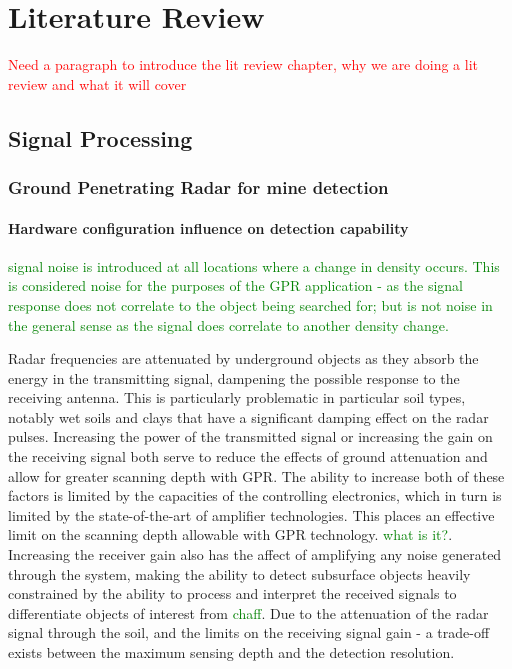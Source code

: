 \documentclass[main.tex]{subfiles}
\begin{document}
\chapter{Literature Review}
\textcolor{red}{Need a paragraph to introduce the lit review chapter, why we are doing a lit review and what it will cover}

\section{Signal Processing}
% 
\subsection{Ground Penetrating Radar for mine detection}
\subsubsection{Hardware configuration influence on detection capability}
\textcolor{green}{signal noise is introduced at all locations where a change in density occurs. This is considered noise for the purposes of the GPR application - as the signal response does not correlate to the object being searched for; but is not noise in the general sense as the signal does correlate to another density change.}

Radar frequencies are attenuated by underground objects as they absorb the energy in the transmitting signal, dampening the possible response to the receiving antenna. This is particularly problematic in particular soil types, notably wet soils and clays that have a significant damping effect on the radar pulses. Increasing the power of the transmitted signal or increasing the gain on the receiving signal both serve to reduce the effects of ground attenuation and allow for greater scanning depth with GPR. The ability to increase both of these factors is limited by the capacities of the controlling electronics, which in turn is limited by the state-of-the-art of amplifier technologies. This places an effective limit on the scanning depth allowable with GPR technology. \textcolor{green}{what is it?}. Increasing the receiver gain also has the affect of amplifying any noise generated through the system, making the ability to detect subsurface objects heavily constrained by the ability to process and interpret the received signals to differentiate objects of interest from \textcolor{green}{chaff}. Due to the attenuation of the radar signal through the soil, and the limits on the receiving signal gain - a trade-off exists between the maximum sensing depth and the detection resolution.
\end{document}
